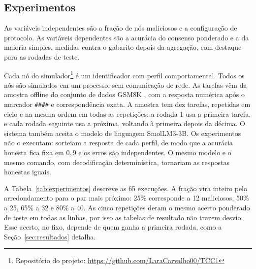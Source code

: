 \documentclass[12pt]{article}
\begin{document}
\subsection{Experimentos}

As variáveis independentes são a fração de nós maliciosos e a configuração de protocolo. As variáveis dependentes são a acurácia do consenso ponderado e a da maioria simples, medidas contra o gabarito depois da agregação, com destaque para as rodadas de teste.

Cada nó do simulador\footnote{Repositório do projeto: \url{https://github.com/LaraCarvalho00/TCC1}} é um identificador com perfil comportamental. Todos os nós são simulados em um processo, sem comunicação de rede. As tarefas vêm da amostra offline do conjunto de dados GSM8K \cite{cobbe2021}, com a resposta numérica após o marcador \texttt{\#\#\#\#} e correspondência exata. A amostra tem dez tarefas, repetidas em ciclo e na mesma ordem em todas as repetições: a rodada 1 usa a primeira tarefa, e cada rodada seguinte usa a próxima, voltando à primeira depois da décima. O sistema também aceita o modelo de linguagem SmolLM3-3B. Os experimentos não o executam: sorteiam a resposta de cada perfil, de modo que a acurácia honesta fica fixa em $0{,}9$ e os erros são independentes. O mesmo modelo e o mesmo comando, com decodificação determinística, tornariam as respostas honestas iguais.

A Tabela~\ref{tab:experimentos} descreve as 65 execuções. A fração vira inteiro pelo arredondamento para o par mais próximo: 25\% corresponde a 12 maliciosos, 50\% a 25, 65\% a 32 e 80\% a 40. As cinco repetições deram o mesmo acerto ponderado de teste em todas as linhas, por isso as tabelas de resultado não trazem desvio. Esse acerto, no fixo, depende de quem ganha a primeira rodada, como a Seção~\ref{sec:resultados} detalha.
\end{document}
